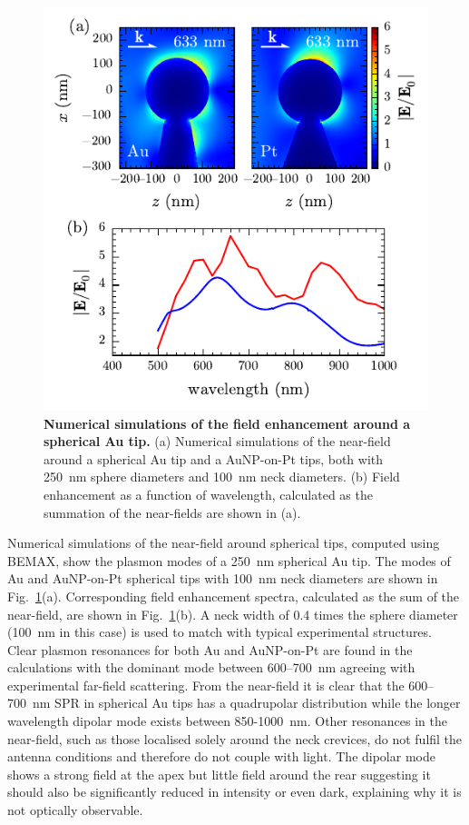 \documentclass{article}
\begin{document}
\begin{figure}[bt]
\centering
\includegraphics{figures/spherical_tip_near_fields}
\caption[Numerical simulations of the field enhancement around a spherical Au tip]{\textbf{Numerical simulations of the field enhancement around a spherical Au tip.} (a) Numerical simulations of the near-field around a spherical Au tip and a AuNP-on-Pt tips, both with \SI{250}{nm} sphere diameters and \SI{100}{nm} neck diameters. (b) Field enhancement as a function of wavelength, calculated as the summation of the near-fields are shown in (a).}
\label{fig:spherical_tip_near_fields}
\end{figure}

Numerical simulations of the near-field around spherical tips, computed using BEMAX, show the plasmon modes of a \SI{250}{nm} spherical Au tip. The modes of Au and AuNP-on-Pt spherical tips with \SI{100}{nm} neck diameters are shown in Fig.~\ref{fig:spherical_tip_near_fields}(a). Corresponding field enhancement spectra, calculated as the sum of the near-field, are shown in Fig.~\ref{fig:spherical_tip_near_fields}(b). A neck width of 0.4 times the sphere diameter (\SI{100}{nm} in this case) is used to match with typical experimental structures. Clear plasmon resonances for both Au and AuNP-on-Pt are found in the calculations with the dominant mode between 600--\SI{700}{nm} agreeing with experimental far-field scattering. From the near-field it is clear that the 600--\SI{700}{nm} SPR in spherical Au tips has a quadrupolar distribution while the longer wavelength dipolar mode exists between 850-\SI{1000}{nm}. Other resonances in the near-field, such as those localised solely around the neck crevices, do not fulfil the antenna conditions and therefore do not couple with light. The dipolar mode shows a strong field at the apex but little field around the rear suggesting it should also be significantly reduced in intensity or even dark, explaining why it is not optically observable.
\end{document}
